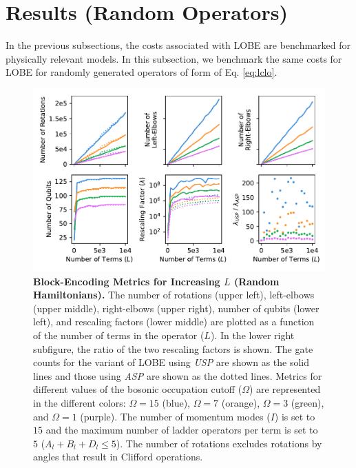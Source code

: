 \section{Results (Random Operators)}
\label{sec:random-op-results}

In the previous subsections, the costs associated with LOBE are benchmarked for physically relevant models.
In this subsection, we benchmark the same costs for LOBE for randomly generated operators of form of Eq. \ref{eq:lclo}.

\begin{figure}
    \centering
    \includegraphics[width=16cm]{figures/random_hamiltonians_metrics_vs_terms.pdf}
    \caption{
        \textbf{Block-Encoding Metrics for Increasing $L$ (Random Hamiltonians).}
        The number of rotations (upper left), left-elbows (upper middle), right-elbows (upper right), number of qubits (lower left), and rescaling factors (lower middle) are plotted as a function of the number of terms in the operator ($L$).
        In the lower right subfigure, the ratio of the two rescaling factors is shown.
        The gate counts for the variant of LOBE using \textit{USP} are shown as the solid lines and those using \textit{ASP} are shown as the dotted lines.
        Metrics for different values of the bosonic occupation cutoff ($\Omega$) are represented in the different colors: $\Omega = 15$ (blue), $\Omega = 7$ (orange), $\Omega = 3$ (green), and $\Omega = 1$ (purple).
        The number of momentum modes ($I$) is set to $15$ and the maximum number of ladder operators per term is set to $5$ ($A_l + B_l + D_l \leq 5$).
        The number of rotations excludes rotations by angles that result in Clifford operations.
    }
    \label{fig:random_hamiltonians_metrics_vs_terms}
\end{figure}


